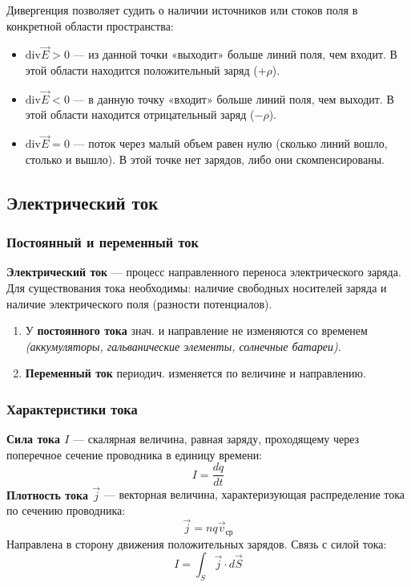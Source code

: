 Дивергенция позволяет судить о наличии источников или стоков поля в конкретной области пространства:

\begin{itemize}
    \item $\text{div} \vec{E} > 0$ --- из данной точки «выходит» больше линий поля, чем входит. В этой области находится положительный заряд ($+\rho$).
    
    \item $\text{div} \vec{E} < 0$ --- в данную точку «входит» больше линий поля, чем выходит. В этой области находится отрицательный заряд ($-\rho$).
    
    \item $\text{div} \vec{E} = 0$ --- поток через малый объем равен нулю (сколько линий вошло, столько и вышло). В этой точке нет зарядов, либо они скомпенсированы.
\end{itemize}

\subsection{Электрический ток}

\subsubsection{Постоянный и переменный ток}

\textbf{Электрический ток} --- процесс направленного переноса электрического заряда. Для существования тока необходимы: наличие свободных носителей заряда и наличие электрического поля (разности потенциалов).

\begin{enumerate}
    \item У \textbf{постоянного тока} знач. и направление не изменяются со временем \textit{(аккумуляторы, гальванические элементы, солнечные батареи)}.
    \item \textbf{Переменный ток} периодич. изменяется по величине и направлению.
\end{enumerate}

\subsubsection{Характеристики тока}

\textbf{Сила тока $I$} --- скалярная величина, равная заряду, проходящему через поперечное сечение проводника в единицу времени:
\[
    I = \frac{dq}{dt}
\]
\textbf{Плотность тока $\vec{j}$} --- векторная величина, характеризующая распределение тока по сечению проводника:
\[
    \vec{j} = n q \vec{v}_{\text{ср}}
\]
Направлена в сторону движения положительных зарядов. Связь с силой тока:
\[ I = \int_S \vec{j} \cdot d\vec{S} \]

